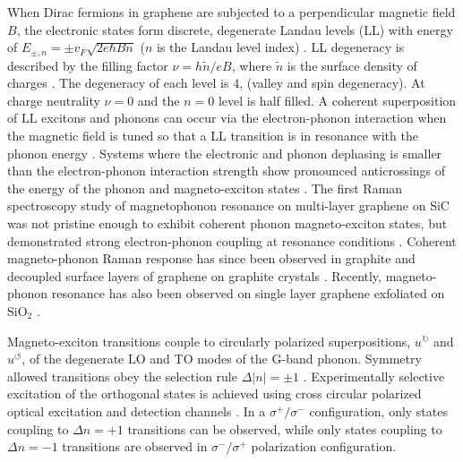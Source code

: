 \documentclass[prl,aps,superscriptaddress,showpacs,reprint]{revtex4-1}
\begin{document}
When Dirac fermions in graphene are subjected to a perpendicular magnetic field $B$, the electronic states form discrete, degenerate Landau levels (LL) with energy of $E_{\pm, n}=\pm v_F\sqrt{2e\hbar Bn}$ ($n$ is the Landau level index) \cite{neto2009electronic,goerbig2011electronic}. LL degeneracy is described by  the filling factor $\nu = h\widetilde{n}/eB$, where $\widetilde{n}$ is the surface density of charges \cite{goerbig2007filling}.
The degeneracy of each level is 4, (valley and spin degeneracy). At charge neutrality $\nu = 0$ and the $n=0$ level is half filled. A coherent superposition of LL excitons and phonons can occur via the electron-phonon interaction when the magnetic field is tuned so that a LL transition is in resonance with the phonon energy \cite{ando2007magnetic,goerbig2007filling,goerbig2011electronic}. Systems where the electronic and phonon dephasing is smaller than the electron-phonon interaction strength show pronounced anticrossings of the energy of the phonon and magneto-exciton states \cite{ando2007magnetic,goerbig2007filling,goerbig2011electronic}. The first Raman spectroscopy study of magnetophonon resonance on multi-layer graphene on SiC was not pristine enough to exhibit coherent phonon magneto-exciton states, but demonstrated strong electron-phonon coupling at resonance conditions \cite{faugeras2009tuning} . Coherent magneto-phonon Raman response has since been observed in graphite \cite{PhysRevB.84.235138,kim2012magnetophonon,yan2010observation} and decoupled surface layers of graphene on graphite crystals \cite{kuhne2012polarization,faugeras2011magneto,yan2010observation}. Recently, magneto-phonon resonance has also been observed on single layer graphene exfoliated on SiO$_2$ \cite{PhysRevLett.110.227402,kossacki2012circular}.

Magneto-exciton transitions couple to circularly polarized superpositions, $u^{\circlearrowright}$ and $u^{\circlearrowleft}$, of the degenerate LO and TO modes of the G-band phonon. Symmetry allowed transitions obey the selection rule $\Delta\left|n\right|=\pm 1$ \cite{PhysRevB.84.235138}. Experimentally selective excitation of the orthogonal states is achieved using cross circular polarized optical excitation and detection channels \cite{PhysRevLett.110.227402,kossacki2012circular,kuhne2012polarization}. In a $\sigma^+/\sigma^-$ configuration, only states coupling to $\Delta n=+1$ transitions can be observed, while only states coupling to $\Delta n=-1$ transitions are observed in $\sigma^-/\sigma^+$ polarization configuration.
\end{document}
